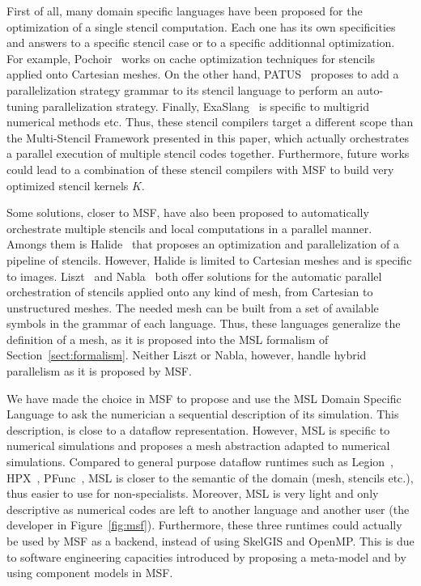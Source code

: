 First of all, many domain specific languages have been proposed for the optimization of a single stencil computation. Each one has its own specificities and answers to a specific stencil case or to a specific additionnal optimization. For example, Pochoir~\cite{spaaTangCKLL11} works on cache optimization techniques for stencils applied onto Cartesian meshes. On the other hand, PATUS~\cite{citeulike12258902} proposes to add a parallelization strategy grammar to its stencil language to perform an auto-tuning parallelization strategy. Finally, ExaSlang~\cite{Schmitt:2014:EDL:2691166.2691171} is specific to multigrid numerical methods etc. Thus, these stencil compilers target a different scope than the Multi-Stencil Framework presented in this paper, which actually orchestrates a parallel execution of multiple stencil codes together. Furthermore, future works could lead to a combination of these stencil compilers with MSF to build very optimized stencil kernels $K$.

Some solutions, closer to MSF, have also been proposed to automatically orchestrate multiple stencils and local computations in a parallel manner. Amongs them is Halide~\cite{Ragan-Kelley:2013:HLC:2491956.2462176} that proposes an optimization and parallelization of a pipeline of stencils. However, Halide is limited to Cartesian meshes and is specific to images. Liszt~\cite{DeVito:2011:LDS:2063384.2063396} and Nabla~\cite{Camier:2015:IPP:2820083.2820107} both offer solutions for the automatic parallel orchestration of stencils applied onto any kind of mesh, from Cartesian to unstructured meshes. The needed mesh can be built from a set of available symbols in the grammar of each language. Thus, these languages generalize the definition of a mesh, as it is proposed into the MSL formalism of Section~\ref{sect:formalism}. Neither Liszt or Nabla, however, handle hybrid parallelism as it is proposed by MSF.

We have made the choice in MSF to propose and use the MSL Domain Specific Language to ask the numerician a sequential description of its simulation. This description, is close to a dataflow representation. However, MSL is specific to numerical simulations and proposes a mesh abstraction adapted to numerical simulations. Compared to general purpose dataflow runtimes such as Legion~\cite{bauer:legion:sc:2012}, HPX~\cite{}, PFunc~\cite{}, MSL is closer to the semantic of the domain (mesh, stencils etc.), thus easier to use for non-specialists. Moreover, MSL is very light and only descriptive as numerical codes are left to another language and another user (the developer in Figure~\ref{fig:msf}). Furthermore, these three runtimes could actually be used by MSF as a backend, instead of using SkelGIS and OpenMP.
This is due to software engineering capacities introduced by proposing a meta-model and by using component models in MSF. 

